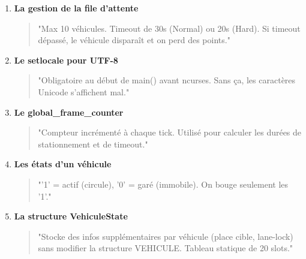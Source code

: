 \documentclass[11pt,a4paper]{article}
\begin{document}
\begin{enumerate}
    \item \textbf{La gestion de la file d'attente}
    \begin{quote}
    "Max 10 véhicules. Timeout de 30s (Normal) ou 20s (Hard). Si timeout dépassé, le véhicule disparaît et on perd des points."
    \end{quote}

    \item \textbf{Le setlocale pour UTF-8}
    \begin{quote}
    "Obligatoire au début de main() avant ncurses. Sans ça, les caractères Unicode s'affichent mal."
    \end{quote}

    \item \textbf{Le global\_frame\_counter}
    \begin{quote}
    "Compteur incrémenté à chaque tick. Utilisé pour calculer les durées de stationnement et de timeout."
    \end{quote}

    \item \textbf{Les états d'un véhicule}
    \begin{quote}
    "'1' = actif (circule), '0' = garé (immobile). On bouge seulement les '1'."
    \end{quote}

    \item \textbf{La structure VehiculeState}
    \begin{quote}
    "Stocke des infos supplémentaires par véhicule (place cible, lane-lock) sans modifier la structure VEHICULE. Tableau statique de 20 slots."
    \end{quote}
\end{enumerate}

\newpage
\end{document}
